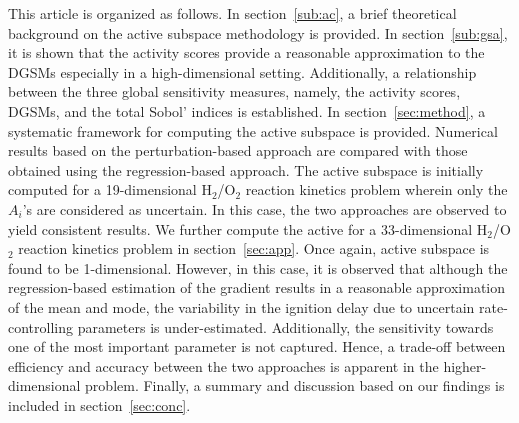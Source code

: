 This article is organized as follows. In section~\ref{sub:ac}, a brief
theoretical background on the active subspace methodology is provided. In
section~\ref{sub:gsa}, it is shown that the activity scores provide a
reasonable approximation to the DGSMs especially in a high-dimensional setting.
Additionally, a relationship between the three global sensitivity measures,
namely, the activity scores, DGSMs, and the total Sobol' indices is
established. In section~\ref{sec:method}, a systematic framework for computing
the active subspace is provided. 
Numerical results based on the perturbation-based approach are compared with those
obtained using the regression-based approach.  The active 
subspace is initially computed for a 19-dimensional 
H$_2$/O$_2$ reaction kinetics problem wherein only the $A_i$'s are
considered as uncertain. In this case, the two approaches are observed to yield
consistent results. We further compute the active  for a 33-dimensional H$_2$/O$_2$
reaction kinetics problem in section~\ref{sec:app}. Once again, 
active subspace is found to be 1-dimensional. However, in this case,
it is observed that although the regression-based estimation of the gradient results in a 
reasonable approximation of the mean and mode, the variability in the ignition delay
due to uncertain rate-controlling parameters is under-estimated. Additionally,  
the sensitivity towards one of the most important parameter is not captured.
Hence, a trade-off between efficiency and accuracy between the two approaches is
apparent in the higher-dimensional problem. 
Finally, a summary and discussion based on our findings is included in
section~\ref{sec:conc}.










 





